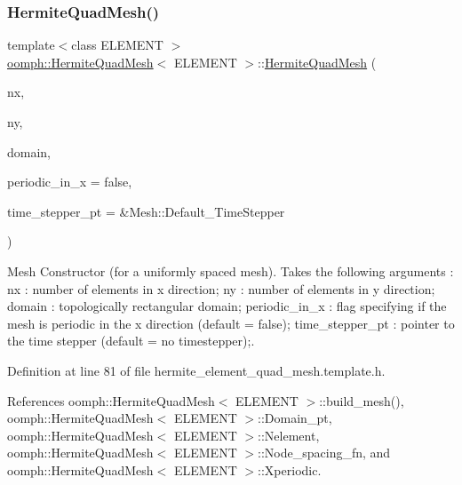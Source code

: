 \subsubsection{\texorpdfstring{Hermite\+Quad\+Mesh()}{HermiteQuadMesh()}\hspace{0.1cm}{\footnotesize\ttfamily [1/2]}}
{\footnotesize\ttfamily template$<$class E\+L\+E\+M\+E\+NT $>$ \\
\hyperlink{classoomph_1_1HermiteQuadMesh}{oomph\+::\+Hermite\+Quad\+Mesh}$<$ E\+L\+E\+M\+E\+NT $>$\+::\hyperlink{classoomph_1_1HermiteQuadMesh}{Hermite\+Quad\+Mesh} (\begin{DoxyParamCaption}\item[{const unsigned \&}]{nx,  }\item[{const unsigned \&}]{ny,  }\item[{\hyperlink{classoomph_1_1TopologicallyRectangularDomain}{Topologically\+Rectangular\+Domain} $\ast$}]{domain,  }\item[{const bool \&}]{periodic\+\_\+in\+\_\+x = {\ttfamily false},  }\item[{Time\+Stepper $\ast$}]{time\+\_\+stepper\+\_\+pt = {\ttfamily \&Mesh\+:\+:Default\+\_\+TimeStepper} }\end{DoxyParamCaption})\hspace{0.3cm}{\ttfamily [inline]}}



Mesh Constructor (for a uniformly spaced mesh). Takes the following arguments \+: nx \+: number of elements in x direction; ny \+: number of elements in y direction; domain \+: topologically rectangular domain; periodic\+\_\+in\+\_\+x \+: flag specifying if the mesh is periodic in the x direction (default = false); time\+\_\+stepper\+\_\+pt \+: pointer to the time stepper (default = no timestepper);. 



Definition at line 81 of file hermite\+\_\+element\+\_\+quad\+\_\+mesh.\+template.\+h.



References oomph\+::\+Hermite\+Quad\+Mesh$<$ E\+L\+E\+M\+E\+N\+T $>$\+::build\+\_\+mesh(), oomph\+::\+Hermite\+Quad\+Mesh$<$ E\+L\+E\+M\+E\+N\+T $>$\+::\+Domain\+\_\+pt, oomph\+::\+Hermite\+Quad\+Mesh$<$ E\+L\+E\+M\+E\+N\+T $>$\+::\+Nelement, oomph\+::\+Hermite\+Quad\+Mesh$<$ E\+L\+E\+M\+E\+N\+T $>$\+::\+Node\+\_\+spacing\+\_\+fn, and oomph\+::\+Hermite\+Quad\+Mesh$<$ E\+L\+E\+M\+E\+N\+T $>$\+::\+Xperiodic.

\mbox{\label{classoomph_1_1HermiteQuadMesh_ae28d471336aebafc5fe5e9f303ab0ad8}} 
